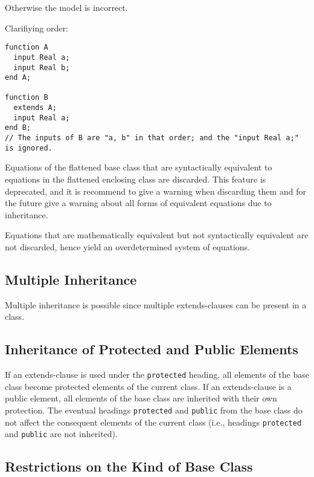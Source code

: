 Otherwise the model is incorrect.

\begin{nonnormative}
Clarifiying order:
\begin{lstlisting}[language=modelica]
function A
  input Real a;
  input Real b;
end A;

function B
  extends A;
  input Real a;
end B;
// The inputs of B are "a, b" in that order; and the "input Real a;" is ignored.
\end{lstlisting}
\end{nonnormative}

Equations of the flattened base class that are syntactically equivalent
to equations in the flattened enclosing class are discarded. This
feature is deprecated, and it is recommend to give a warning when
discarding them and for the future give a warning about all forms of
equivalent equations due to inheritance.

\begin{nonnormative}
Equations that are mathematically equivalent but not syntactically equivalent are not discarded, hence yield an overdetermined system of equations.
\end{nonnormative}

\subsection{Multiple Inheritance}\label{multiple-inheritance}

Multiple inheritance is possible since multiple extends-clauses can be
present in a class.

\subsection{Inheritance of Protected and Public Elements}\label{inheritance-of-protected-and-public-elements}

If an extends-clause is used under the \lstinline!protected! heading, all elements
of the base class become protected elements of the current class. If an
extends-clause is a public element, all elements of the base class are
inherited with their own protection. The eventual headings \lstinline!protected! and
\lstinline!public! from the base class do not affect the consequent elements of the
current class (i.e., headings \lstinline!protected! and \lstinline!public! are not inherited).

\subsection{Restrictions on the Kind of Base Class}\label{restrictions-on-the-kind-of-base-class}

